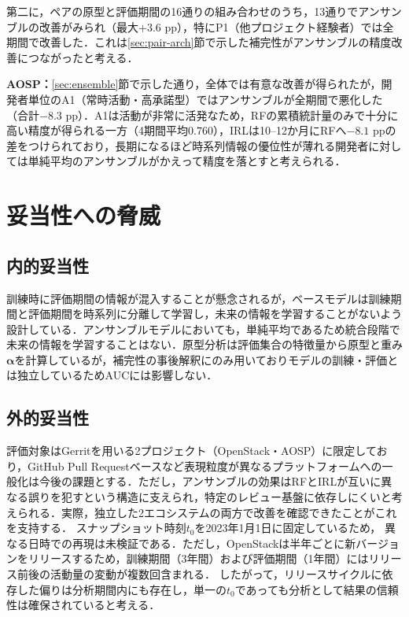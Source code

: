 \documentclass[submit,noauthor,ses,dvipdfmx]{ipsj}
\begin{document}
第二に，ペアの原型と評価期間の16通りの組み合わせのうち，13通りでアンサンブルの改善がみられ（最大$+3.6$ pp），特にP1（他プロジェクト経験者）では全期間で改善した．これは\ref{sec:pair-arch}節で示した補完性がアンサンブルの精度改善につながったと考える．

\noindent\textbf{AOSP：}\ref{sec:ensemble}節で示した通り，全体では有意な改善が得られたが，開発者単位のA1（常時活動・高承諾型）ではアンサンブルが全期間で悪化した（合計$-8.3$ pp）．A1は活動が非常に活発なため，RFの累積統計量のみで十分に高い精度が得られる一方（4期間平均$0.760$），IRLは10--12か月にRFへ$-8.1$ ppの差をつけられており，長期になるほど時系列情報の優位性が薄れる開発者に対しては単純平均のアンサンブルがかえって精度を落とすと考えられる．

\section{妥当性への脅威}\label{sec:validity}

\subsection{内的妥当性}
訓練時に評価期間の情報が混入することが懸念されるが，ベースモデルは訓練期間と評価期間を時系列に分離して学習し，未来の情報を学習することがないよう設計している．アンサンブルモデルにおいても，単純平均であるため統合段階で未来の情報を学習することはない．原型分析は評価集合の特徴量から原型と重み$\bm{\alpha}$を計算しているが，補完性の事後解釈にのみ用いておりモデルの訓練・評価とは独立しているためAUCには影響しない．

\vspace{-1mm}
\subsection{外的妥当性}
評価対象はGerritを用いる2プロジェクト（OpenStack・AOSP）に限定しており，GitHub Pull Requestベースなど表現粒度が異なるプラットフォームへの一般化は今後の課題とする．ただし，アンサンブルの効果はRFとIRLが互いに異なる誤りを犯すという構造に支えられ，特定のレビュー基盤に依存しにくいと考えられる．実際，独立した2エコシステムの両方で改善を確認できたことがこれを支持する．
スナップショット時刻$t_0$を2023年1月1日に固定しているため，
異なる日時での再現は未検証である．ただし，OpenStackは半年ごとに新バージョンをリリースするため，訓練期間（3年間）および評価期間（1年間）にはリリース前後の活動量の変動が複数回含まれる．
したがって，リリースサイクルに依存した偏りは分析期間内にも存在し，単一の$t_0$であっても分析として結果の信頼性は確保されていると考える．
\end{document}

